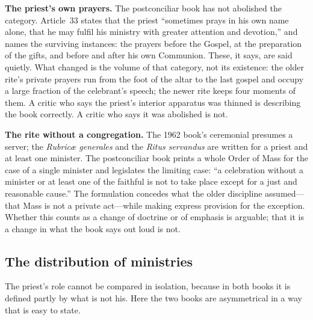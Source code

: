\textbf{The priest's own prayers.} The postconciliar book has not abolished the category. Article~33 states that the priest ``sometimes prays in his own name alone, that he may fulfil his ministry with greater attention and devotion,'' and names the surviving instances: the prayers before the Gospel, at the preparation of the gifts, and before and after his own Communion. These, it says, are said quietly. What changed is the volume of that category, not its existence: the older rite's private prayers run from the foot of the altar to the last gospel and occupy a large fraction of the celebrant's speech; the newer rite keeps four moments of them. A critic who says the priest's interior apparatus was thinned is describing the book correctly. A critic who says it was abolished is not.

\textbf{The rite without a congregation.} The 1962 book's ceremonial presumes a server; the \emph{Rubricæ generales} and the \emph{Ritus servandus} are written for a priest and at least one minister. The postconciliar book prints a whole Order of Mass for the case of a single minister and legislates the limiting case: ``a celebration without a minister or at least one of the faithful is not to take place except for a just and reasonable cause.'' The formulation concedes what the older discipline assumed---that Mass is not a private act---while making express provision for the exception. Whether this counts as a change of doctrine or of emphasis is arguable; that it is a change in what the book says out loud is not.

\subsection{The distribution of ministries}

The priest's role cannot be compared in isolation, because in both books it is defined partly by what is not his. Here the two books are asymmetrical in a way that is easy to state.

